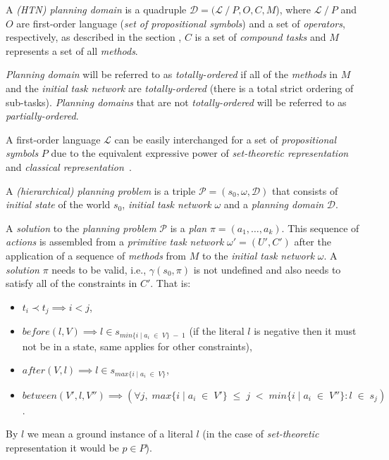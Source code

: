 \begin{defn}\label{def02:11}
    A \emph{(HTN) planning domain} is a quadruple $\mathcal{D} = (\mathcal{L} \ / \ P, O, C, M$), where $\mathcal{L} \ / \ P$ and $O$ are first-order language (\emph{set of propositional symbols}) and a set of \emph{operators}, respectively, as described in the section , $C$ is a set of \emph{compound tasks} and $M$ represents a set of all \emph{methods}.

    \noindent
    \emph{Planning domain} will be referred to as \emph{totally-ordered} if all of the \emph{methods} in $M$ and the \emph{initial task network} are \emph{totally-ordered} (there is a total strict ordering of sub-tasks). \emph{Planning domains} that are not \emph{totally-ordered} will be referred to as \emph{partially-ordered}.
\end{defn}

\medskip\noindent
A first-order language $\mathcal{L}$ can be easily interchanged for a set of \emph{propositional symbols} $P$ due to the equivalent expressive power of \emph{set-theoretic representation} and \emph{classical representation}~\cite{nau}.

\begin{defn}\label{def02:12}
    A \emph{(hierarchical) planning problem} is a triple $\mathcal{P} = (s_0,\omega,\mathcal{D})$ that consists of \emph{initial state} of the world $s_0$, \emph{initial task network} $\omega$ and a \emph{planning domain} $\mathcal{D}$.
\end{defn}

\begin{defn}\label{def02:13}
    A \emph{solution} to the \emph{planning problem} $\mathcal{P}$ is a \emph{plan} $\pi=(a_1,\dots,a_k)$. This sequence of \emph{actions} is assembled from a \emph{primitive task network} $\omega'=(U', C')$ after the application of a sequence of \emph{methods} from $M$ to the \emph{initial task network} $\omega$. A \emph{solution} $\pi$ needs to be valid, i.e., $\gamma(s_0,\pi)$ is not undefined and also needs to satisfy all of the constraints in $C'$. That is:
    
    \begin{itemize}
        \item $t_i \prec t_j \implies i < j$,
        
        \item $before(l, V) \implies l \in s_{min\{i \; | \; a_i \; \in \; V\} \; - \; 1}$ (if the literal $l$ is negative then it must not be in a state, same applies for other constraints),
        
        \item $after(V,l) \implies l \in s_{max\{i \; | \; a_i \; \in \; V\}}$,
        
        \item $between(V',l,V'') \implies (\forall j, \; max\{i \; | \; a_i \; \in \; V'\} \; \leq \; j \; < \; min\{i \; | \; a_i \; \in \; V''\}: l \; \in \; s_j)$.
    \end{itemize}
    
    By $l$ we mean a ground instance of a literal $l$ (in the case of \emph{set-theoretic} representation it would be $p \in P$).
\end{defn}

